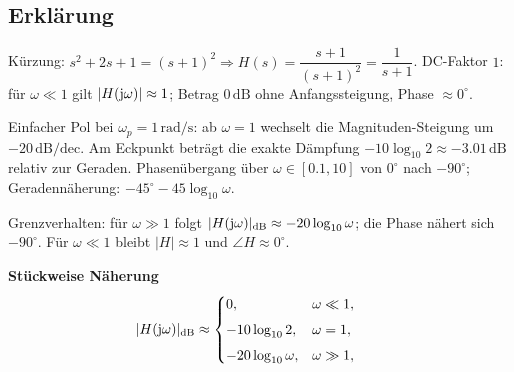 \subsection{Erklärung}
\vspace{5mm}
\begin{description}[leftmargin=1.2em,labelsep=.6em,font=\bfseries]
\item[Schritt 1] Kürzung: $s^2+2s+1=(s+1)^2\Rightarrow H(s)=\dfrac{s+1}{(s+1)^2}=\dfrac{1}{s+1}$. DC-Faktor $1$: für $\omega\ll1$ gilt $|H(\operatorname{j}\!\omega)|\approx1$; Betrag $0\,\mathrm{dB}$ ohne Anfangssteigung, Phase $\approx0^\circ$.
\item[Schritt 2] Einfacher Pol bei $\omega_p=1\,\mathrm{rad/s}$: ab $\omega=1$ wechselt die Magnituden-Steigung um $-20\,\mathrm{dB/dec}$. Am Eckpunkt beträgt die exakte Dämpfung $-10\log_{10}2\approx-3.01\,\mathrm{dB}$ relativ zur Geraden. Phasenübergang über $\omega\in[0.1,10]$ von $0^\circ$ nach $-90^\circ$; Geradennäherung: $-45^\circ-45\log_{10}\omega$.
\item[Schritt 3] Grenzverhalten: für $\omega\gg1$ folgt $|H(\operatorname{j}\!\omega)|_{\mathrm{dB}}\approx-20\log_{10}\omega$; die Phase nähert sich $-90^\circ$. Für $\omega\ll1$ bleibt $|H|\approx1$ und $\angle H\approx0^\circ$.
\end{description}

\vspace{0.5cm}
\medskip
\noindent\textbf{Stückweise Näherung}
\[
|H(\operatorname{j}\!\omega)|_{\mathrm{dB}}\approx
\begin{cases}
0,& \omega\ll1,\\[4pt]
-10\log_{10}2,& \omega=1,\\[4pt]
-20\log_{10}\omega,& \omega\gg1,
\end{cases}
\qquad
\]
\newpage